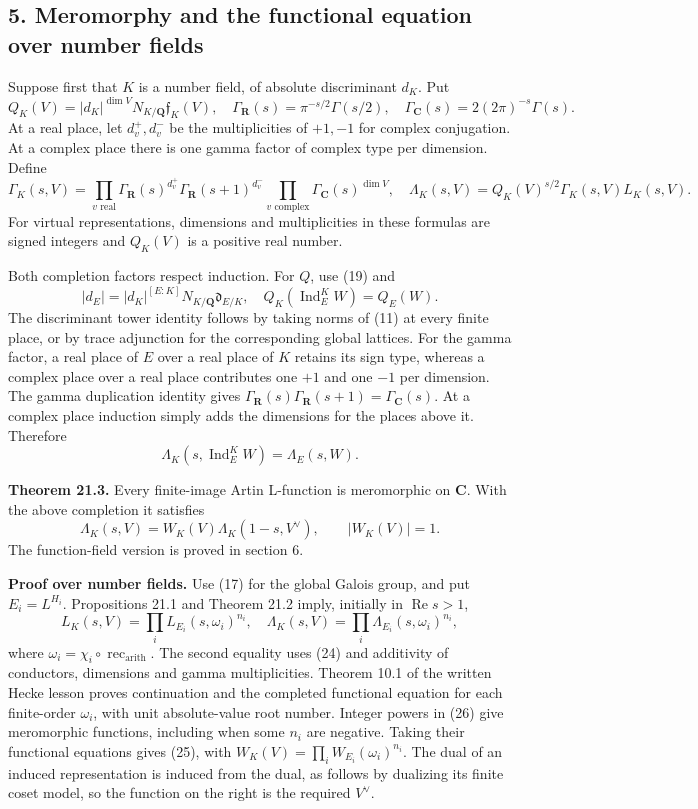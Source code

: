 \documentclass[11pt,a4paper]{article}
\begin{document}
\subsection{5. Meromorphy and the functional equation over number
fields}\label{meromorphy-and-the-functional-equation-over-number-fields}

Suppose first that \(K\) is a number field, of absolute discriminant
\(d_K\). Put \[
Q_K(V)=|d_K|^{\dim V}N_{K/\mathbf Q}\mathfrak f_K(V),\quad
\Gamma_{\mathbf R}(s)=\pi^{-s/2}\Gamma(s/2),\quad
\Gamma_{\mathbf C}(s)=2(2\pi)^{-s}\Gamma(s).
\tag{21}
\] At a real place, let \(d_v^+,d_v^-\) be the multiplicities of
\(+1,-1\) for complex conjugation. At a complex place there is one gamma
factor of complex type per dimension. Define \[
\Gamma_K(s,V)=
\prod_{v\text{ real}}\Gamma_{\mathbf R}(s)^{d_v^+}
                         \Gamma_{\mathbf R}(s+1)^{d_v^-}
\prod_{v\text{ complex}}\Gamma_{\mathbf C}(s)^{\dim V},
\quad
\Lambda_K(s,V)=Q_K(V)^{s/2}\Gamma_K(s,V)L_K(s,V).
\tag{22}
\] For virtual representations, dimensions and multiplicities in these
formulas are signed integers and \(Q_K(V)\) is a positive real number.

Both completion factors respect induction. For \(Q\), use (19) and \[
|d_E|=|d_K|^{[E:K]}N_{K/\mathbf Q}\mathfrak d_{E/K},
\quad Q_K(\operatorname{Ind}_E^K W)=Q_E(W).
\tag{23}
\] The discriminant tower identity follows by taking norms of (11) at
every finite place, or by trace adjunction for the corresponding global
lattices. For the gamma factor, a real place of \(E\) over a real place
of \(K\) retains its sign type, whereas a complex place over a real
place contributes one \(+1\) and one \(-1\) per dimension. The gamma
duplication identity gives
\(\Gamma_{\mathbf R}(s)\Gamma_{\mathbf R}(s+1)=\Gamma_{\mathbf C}(s)\).
At a complex place induction simply adds the dimensions for the places
above it. Therefore \[
\Lambda_K(s,\operatorname{Ind}_E^K W)=\Lambda_E(s,W).
\tag{24}
\]

\textbf{Theorem 21.3.} Every finite-image Artin L-function is
meromorphic on \(\mathbf C\). With the above completion it satisfies \[
\Lambda_K(s,V)=W_K(V)\Lambda_K(1-s,V^\vee),
\qquad |W_K(V)|=1.
\tag{25}
\] The function-field version is proved in section 6.

\textbf{Proof over number fields.} Use (17) for the global Galois group,
and put \(E_i=L^{H_i}\). Propositions 21.1 and Theorem 21.2 imply,
initially in \(\operatorname{Re}s>1\), \[
L_K(s,V)=\prod_i L_{E_i}(s,\omega_i)^{n_i},
\quad
\Lambda_K(s,V)=\prod_i\Lambda_{E_i}(s,\omega_i)^{n_i},
\tag{26}
\] where \(\omega_i=\chi_i\circ\operatorname{rec}_{\mathrm{arith}}\).
The second equality uses (24) and additivity of conductors, dimensions
and gamma multiplicities. Theorem 10.1 of the written Hecke lesson
proves continuation and the completed functional equation for each
finite-order \(\omega_i\), with unit absolute-value root number. Integer
powers in (26) give meromorphic functions, including when some \(n_i\)
are negative. Taking their functional equations gives (25), with
\(W_K(V)=\prod_i W_{E_i}(\omega_i)^{n_i}\). The dual of an induced
representation is induced from the dual, as follows by dualizing its
finite coset model, so the function on the right is the required
\(V^\vee\).
\end{document}
